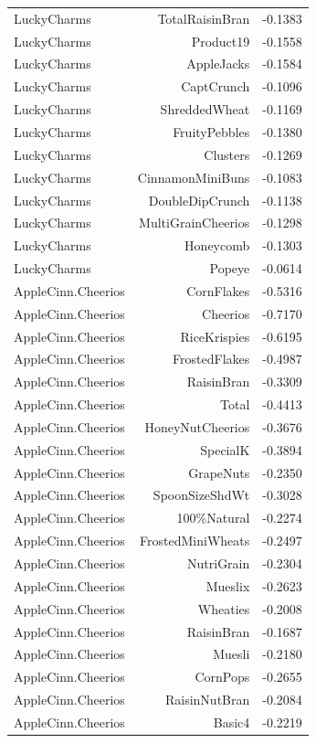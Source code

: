 \begin{longtable}{@{}lrr@{}}
LuckyCharms & TotalRaisinBran & -0.1383 \\
LuckyCharms & Product19 & -0.1558 \\
LuckyCharms & AppleJacks & -0.1584 \\
LuckyCharms & CaptCrunch & -0.1096 \\
LuckyCharms & ShreddedWheat & -0.1169 \\
LuckyCharms & FruityPebbles & -0.1380 \\
LuckyCharms & Clusters & -0.1269 \\
LuckyCharms & CinnamonMiniBuns & -0.1083 \\
LuckyCharms & DoubleDipCrunch & -0.1138 \\
LuckyCharms & MultiGrainCheerios & -0.1298 \\
LuckyCharms & Honeycomb & -0.1303 \\
LuckyCharms & Popeye & -0.0614 \\
AppleCinn.Cheerios & CornFlakes & -0.5316 \\
AppleCinn.Cheerios & Cheerios & -0.7170 \\
AppleCinn.Cheerios & RiceKrispies & -0.6195 \\
AppleCinn.Cheerios & FrostedFlakes & -0.4987 \\
AppleCinn.Cheerios & RaisinBran & -0.3309 \\
AppleCinn.Cheerios & Total & -0.4413 \\
AppleCinn.Cheerios & HoneyNutCheerios & -0.3676 \\
AppleCinn.Cheerios & SpecialK & -0.3894 \\
AppleCinn.Cheerios & GrapeNuts & -0.2350 \\
AppleCinn.Cheerios & SpoonSizeShdWt & -0.3028 \\
AppleCinn.Cheerios & 100\%Natural & -0.2274 \\
AppleCinn.Cheerios & FrostedMiniWheats & -0.2497 \\
AppleCinn.Cheerios & NutriGrain & -0.2304 \\
AppleCinn.Cheerios & Mueslix & -0.2623 \\
AppleCinn.Cheerios & Wheaties & -0.2008 \\
AppleCinn.Cheerios & RaisinBran & -0.1687 \\
AppleCinn.Cheerios & Muesli & -0.2180 \\
AppleCinn.Cheerios & CornPops & -0.2655 \\
AppleCinn.Cheerios & RaisinNutBran & -0.2084 \\
AppleCinn.Cheerios & Basic4 & -0.2219 \\

\end{longtable}
